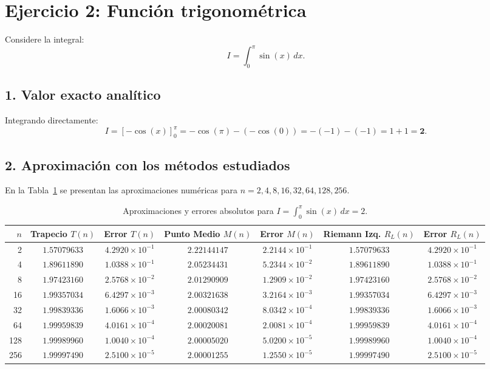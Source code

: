 \documentclass[11pt,a4paper]{article}
\begin{document}
\section{Ejercicio 2: Función trigonométrica}

Considere la integral:
\begin{equation}
    I = \int_0^\pi \sin(x)\, dx.
\end{equation}

\subsection{1. Valor exacto analítico}
Integrando directamente:
\begin{equation}
    I = [-\cos(x)]_0^\pi = -\cos(\pi) - (-\cos(0)) = -(-1) - (-1) = 1 + 1 = \mathbf{2}.
\end{equation}

\subsection{2. Aproximación con los métodos estudiados}
En la Tabla~\ref{tab:ejercicio2_errores} se presentan las aproximaciones numéricas para $n = 2, 4, 8, 16, 32, 64, 128, 256$.

\begin{table}[h!]
\centering
\caption{Aproximaciones y errores absolutos para $I = \int_0^\pi \sin(x)\, dx = 2$.}
\label{tab:ejercicio2_errores}
\begin{tabular}{rcccccc}
\toprule
$n$ & Trapecio $T(n)$ & Error $T(n)$ & Punto Medio $M(n)$ & Error $M(n)$ & Riemann Izq. $R_L(n)$ & Error $R_L(n)$ \\
\midrule
2   & $1.57079633$ & $4.2920\times 10^{-1}$ & $2.22144147$ & $2.2144\times 10^{-1}$ & $1.57079633$ & $4.2920\times 10^{-1}$ \\
4   & $1.89611890$ & $1.0388\times 10^{-1}$ & $2.05234431$ & $5.2344\times 10^{-2}$ & $1.89611890$ & $1.0388\times 10^{-1}$ \\
8   & $1.97423160$ & $2.5768\times 10^{-2}$ & $2.01290909$ & $1.2909\times 10^{-2}$ & $1.97423160$ & $2.5768\times 10^{-2}$ \\
16  & $1.99357034$ & $6.4297\times 10^{-3}$ & $2.00321638$ & $3.2164\times 10^{-3}$ & $1.99357034$ & $6.4297\times 10^{-3}$ \\
32  & $1.99839336$ & $1.6066\times 10^{-3}$ & $2.00080342$ & $8.0342\times 10^{-4}$ & $1.99839336$ & $1.6066\times 10^{-3}$ \\
64  & $1.99959839$ & $4.0161\times 10^{-4}$ & $2.00020081$ & $2.0081\times 10^{-4}$ & $1.99959839$ & $4.0161\times 10^{-4}$ \\
128 & $1.99989960$ & $1.0040\times 10^{-4}$ & $2.00005020$ & $5.0200\times 10^{-5}$ & $1.99989960$ & $1.0040\times 10^{-4}$ \\
256 & $1.99997490$ & $2.5100\times 10^{-5}$ & $2.00001255$ & $1.2550\times 10^{-5}$ & $1.99997490$ & $2.5100\times 10^{-5}$ \\
\bottomrule
\end{tabular}
\end{table}
\end{document}

